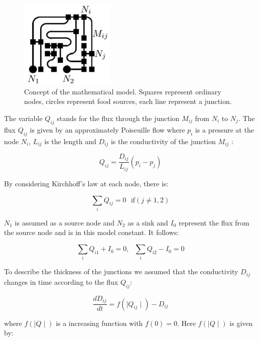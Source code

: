\documentclass[11pt]{scrartcl}
\begin{document}
\begin{figure}[H]
	\centering
	\includegraphics[width=0.4\textwidth]{schema.jpg}
	\caption{Concept of the mathematical model. Squares represent ordinary nodes, circles 			represent food sources, each line represent a junction.}
	\label{fig:schema}
\end{figure}

The variable $Q_{ij}$ stands for the flux through the junction $M_{ij}$ from $N_i$ to $N_j$. The flux $Q_{ij}$ is given by an approximately Poiseuille flow where $p_i$ is a pressure at the node $N_i$, $L_{ij}$ is the length and $D_{ij}$ is the conductivity of the junction $M_{ij}$ :

\begin{equation}
	\label{eq:1}
	Q_{ij}=\frac{D_{ij}}{L_{ij}}\left(p_i-p_j\right)
\end{equation}

By considering Kirchhoff's law at each node, there is:

\begin{equation}
	\label{eq:2}
	\sum_{i} Q_{ij}=0 \,\,\,\, \mathrm{if} \left(j\ne 1,2\right)
\end{equation}

$N_1$ is assumed as a source node and $N_2$ as a sink and $I_0$ represent the flux from the source node and is in this model constant. It follows:

\begin{equation}
	\label{eq:3}
	\sum_{i} Q_{i1}+I_0=0, \,\,\,\, \sum_{i} Q_{i2}-I_0=0
\end{equation}

To describe the thickness of the junctions we assumed that the conductivity $D_{ij}$ changes in time according to the flux $Q_{ij}$:

\begin{equation}
	\label{eq:4}
	\frac{dD_{ij}}{dt}=f\left(\mid Q_{ij} \mid \right)-D_{ij}
\end{equation}

where $f\left(\mid Q \mid \right)$ is a increasing function with $f(0)=0$. Here $f\left(\mid Q \mid \right)$ is given by:
\end{document}
